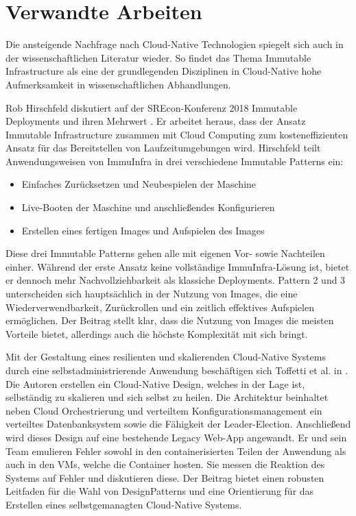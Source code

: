 \documentclass[11pt]{scrartcl}
\begin{document}
\section{Verwandte Arbeiten}

Die ansteigende Nachfrage nach Cloud-Native Technologien spiegelt sich auch in der wissenschaftlichen Literatur wieder. So findet das Thema Immutable Infrastructure als eine der grundlegenden Disziplinen in Cloud-Native hohe Aufmerksamkeit in wissenschaftlichen Abhandlungen.

Rob Hirschfeld diskutiert auf der SREcon-Konferenz 2018 Immutable Deployments und ihren Mehrwert \cite{Hirschfeld:2018}. Er arbeitet heraus, dass der Ansatz Immutable Infrastructure zusammen mit Cloud Computing zum kosteneffizienten Ansatz für das Bereitstellen von Laufzeitumgebungen wird. Hirschfeld teilt Anwendungsweisen von ImmuInfra in drei verschiedene Immutable Patterns ein:  
\begin{itemize}
\item Einfaches Zurücksetzen und Neubespielen der Maschine
\item Live-Booten der Maschine und anschließendes Konfigurieren
\item Erstellen eines fertigen Images und Aufspielen des Images
\end{itemize}

Diese drei Immutable Patterns gehen alle mit eigenen Vor- sowie Nachteilen einher.
Während der erste Ansatz keine vollständige ImmuInfra-Lösung ist, bietet er dennoch mehr Nachvollziehbarkeit als klassiche Deployments. Pattern 2 und 3 unterscheiden sich hauptsächlich in der Nutzung von Images, die eine Wiederverwendbarkeit, Zurückrollen und ein zeitlich effektives Aufspielen ermöglichen. Der Beitrag stellt klar, dass die Nutzung von Images die meisten Vorteile bietet, allerdings auch die höchste Komplexität mit sich bringt.

Mit der Gestaltung eines resilienten und skalierenden Cloud-Native Systems durch eine selbstadministrierende Anwendung beschäftigen sich Toffetti et al. in \cite{Toffetti:2017}. Die Autoren erstellen ein Cloud-Native Design, welches in der Lage ist, selbständig zu skalieren und sich selbst zu heilen. Die Architektur beinhaltet neben Cloud Orchestrierung und verteiltem Konfigurationsmanagement ein verteiltes Datenbanksystem sowie die Fähigkeit der Leader-Election. Anschließend wird dieses Design auf eine bestehende Legacy Web-App angewandt. 
Er und sein Team emulieren Fehler sowohl in den containerisierten Teilen der Anwendung als auch in den VMs, welche die Container hosten. Sie messen die Reaktion des Systems auf Fehler und diskutieren diese. Der Beitrag bietet einen robusten Leitfaden für die Wahl 
von DesignPatterns und eine Orientierung für das Erstellen eines selbstgemanagten Cloud-Native Systems.
\end{document}
